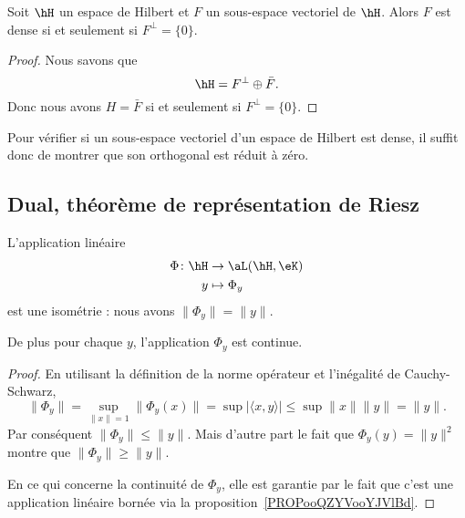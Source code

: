 \begin{proposition}     \label{PropqiWonByiBmc}
	Soit \( \hH\) un espace de Hilbert et \( F\) un sous-espace vectoriel de \( \hH\). Alors \( F\) est dense si et seulement si \( F^{\perp}=\{ 0 \}\).
\end{proposition}

\begin{proof}
	Nous savons que
	\begin{equation}
		\hH=F^{\perp}\oplus \bar F.
	\end{equation}
	Donc nous avons \( H=\bar F\) si et seulement si \( F^{\perp}=\{ 0 \}\).
\end{proof}
Pour vérifier si un sous-espace vectoriel d'un espace de Hilbert est dense, il suffit donc de montrer que son orthogonal est réduit à zéro.

\subsection{Dual, théorème de représentation de Riesz}

\begin{lemma}       \label{LemjYVcHE}
	L'application linéaire
	\begin{equation}
		\begin{aligned}
			\Phi\colon \hH & \to \aL(\hH,\eK) \\
			y              & \mapsto \Phi_y
		\end{aligned}
	\end{equation}
	est une isométrie : nous avons \( \| \Phi_y \|=\| y \|\).

	De plus pour chaque \( y\), l'application \( \Phi_y\) est continue.
\end{lemma}

\begin{proof}
	En utilisant la définition de la norme opérateur et l'inégalité de Cauchy-Schwarz,
	\begin{equation}
		\| \Phi_y \|=\sup_{\| x \| =1}\| \Phi_y(x) \|=\sup| \langle x, y\rangle  |\leq\sup\| x \|\| y \|=\| y \|.
	\end{equation}
	Par conséquent \( \| \Phi_y \|\leq\| y \|\). Mais d'autre part le fait que \( \Phi_y(y)=\| y \|^2\) montre que \( \| \Phi_y \|\geq \| y \|\).

	En ce qui concerne la continuité de \( \Phi_y\), elle est garantie par le fait que c'est une application linéaire bornée via la proposition~\ref{PROPooQZYVooYJVlBd}.
\end{proof}

